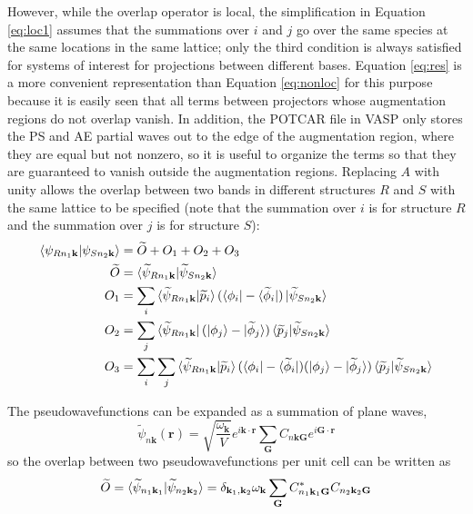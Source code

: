 \documentclass[12pt]{article}
\begin{document}
However, while the overlap operator is local, the simplification in Equation \ref{eq:loc1} assumes that
the summations over $i$ and $j$ go over the same species at the same locations in the same lattice;
only the third condition is always satisfied for systems of interest for projections between different
bases. Equation \ref{eq:res} is a more convenient representation than Equation \ref{eq:nonloc} for this
purpose because it is easily seen that all terms between projectors whose augmentation regions do not
overlap vanish. In addition, the POTCAR file in VASP only stores the PS and AE partial waves out to the
edge of the augmentation region, where they are equal but not nonzero, so it is useful to organize the terms
so that they are guaranteed to vanish outside the augmentation regions. Replacing $A$ with unity
allows the overlap between two bands
in different structures $R$ and $S$ with the same lattice to be specified (note that the
summation over $i$ is for structure $R$ and the summation over $j$ is for structure $S$):
\begin{equation}
\begin{split}
\braket{\psi_{Rn_1\mathbf{k}}|\psi_{Sn_2\mathbf{k}}} & =\widetilde{O}+O_1+O_2+O_3\\
\widetilde{O} & =\braket{\widetilde{\psi}_{Rn_1\mathbf{k}}|\widetilde{\psi}_{Sn_2\mathbf{k}}}\\
O_1 & =\sum_i\braket{\widetilde{\psi}_{Rn_1\mathbf{k}}|\widetilde{p}_i}(\bra{\phi_i}-\bra{\widetilde{\phi}_i})
\ket{\widetilde{\psi}_{Sn_2\mathbf{k}}}\\
O_2 & =\sum_j\bra{\widetilde{\psi}_{Rn_1\mathbf{k}}}(\ket{\phi_j}-\ket{\widetilde{\phi}_j})
\braket{\widetilde{p}_j|\widetilde{\psi}_{Sn_2\mathbf{k}}}\\
O_3 & =\sum_i\sum_j\braket{\widetilde{\psi}_{Rn_1\mathbf{k}}|
\widetilde{p}_i}(\bra{\phi_i}-\bra{\widetilde{\phi}_i})
(\ket{\phi_j}-\ket{\widetilde{\phi}_j})\braket{\widetilde{p}_j|\widetilde{\psi}_{Sn_2\mathbf{k}}}
\end{split}
\label{eq:ov1a}
\end{equation}

The pseudowavefunctions can be expanded as a summation of plane waves,
$$\widetilde{\psi}_{n\mathbf{k}}(\mathbf{r})=\sqrt{\frac{\omega_{\mathbf{k}}}{V}}
e^{i\mathbf{k}\cdot \mathbf{r}}\sum_{\mathbf{G}} C_{n\mathbf{k}\mathbf{G}}
e^{i\mathbf{G}\cdot \mathbf{r}}$$
so the overlap between two pseudowavefunctions per unit cell can be written as
$$\widetilde{O}=\braket{\widetilde{\psi}_{n_1\mathbf{k}_1}|\widetilde{\psi}_{n_2\mathbf{k}_2}}
=\delta_{\mathbf{k}_1,\mathbf{k}_2}
\omega_{\mathbf{k}} \sum_{\mathbf{G}} C^*_{n_1\mathbf{k}_1\mathbf{G}}C_{n_2\mathbf{k}_2\mathbf{G}}$$
\end{document}
